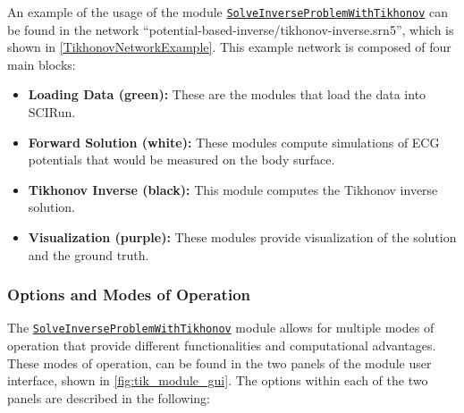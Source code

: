     An example of the usage of the module \href{http://scirundocwiki.sci.utah.edu/SCIRunDocs/index.php/CIBC:Documentation:SCIRun:Reference:BioPSE:SolveInverseProblemWithTikhonov}{{\tt SolveInverseProblemWithTikhonov}} can be found in the network ``potential-based-inverse/tikhonov-inverse.srn5'', which is shown in \autoref{TikhonovNetworkExample}.
    This example network is composed of four main blocks:
    \begin{itemize}
        \item {\bf Loading Data (green):} These are the modules that load the data into SCIRun.
        \item {\bf Forward Solution (white):} These modules compute simulations of ECG potentials that would be measured on the body surface.
        \item {\bf Tikhonov Inverse (black):} This module computes the Tikhonov inverse solution.
        \item {\bf Visualization (purple):} These modules provide visualization of the solution and the ground truth.
    \end{itemize}

    \subsubsection{Options and Modes of Operation}

    The \href{http://scirundocwiki.sci.utah.edu/SCIRunDocs/index.php/CIBC:Documentation:SCIRun:Reference:BioPSE:SolveInverseProblemWithTikhonov}{{\tt SolveInverseProblemWithTikhonov}} module allows for multiple modes of operation that provide different functionalities and computational advantages.
    These modes of operation, can be found in the two panels of the module user interface, shown in \autoref{fig:tik_module_gui}.
    The options within each of the two panels are described in the following:

